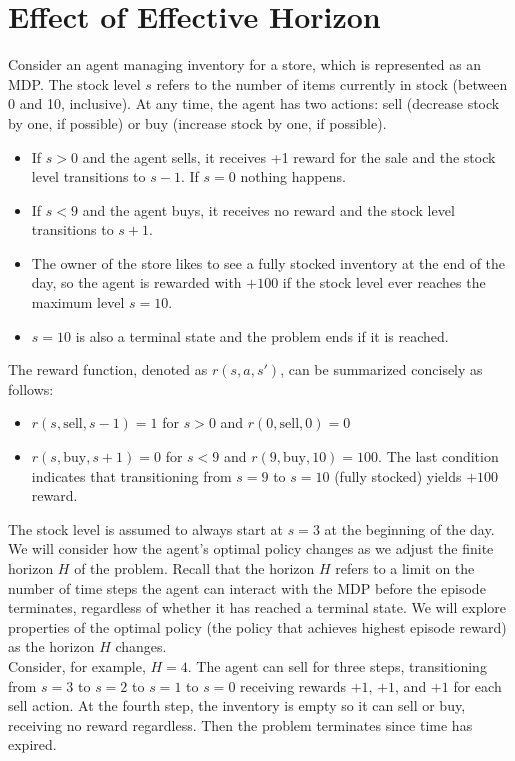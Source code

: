 \section{Effect of Effective Horizon} 


Consider an agent managing inventory for a store, which is represented as an MDP. The stock level $s$ refers to the number of items currently in stock (between 0 and 10, inclusive). At any time, the agent has two actions: sell (decrease stock by one, if possible) or buy (increase stock by one, if possible).  
\begin{itemize}
\item If $s 
 > 0$ and the agent sells, it receives +1 reward for the sale and the stock level transitions to $s - 1$. If $s = 0$ nothing happens.
 \item If $s < 9$ and the agent buys, it receives no reward and the stock level transitions to $s +  1$.
 \item The owner of the store likes to see a fully stocked inventory at the end of the day, so the agent is rewarded with $+100$ if the stock level ever reaches the maximum level $s = 10$.
 \item $s = 10$ is also a terminal state and the problem ends if it is reached.
\end{itemize}

The reward function, denoted as $r(s, a, s')$, can be summarized concisely as follows:
\begin{itemize}
    \item $r(s,\text{sell}, s-1) = 1$ for $s > 0$ and $r(0,\text{sell},0) = 0$
    \item $r(s, \text{buy}, s+1) = 0$ for $s < 9$ and $r(9, \text{buy}, 10) = 100$. The last condition indicates that transitioning from $s = 9$ to $s = 10$ (fully stocked) yields $+100$ reward.
\end{itemize}

\noindent The stock level is assumed to always start at $s = 3$ at the beginning of the day. We will consider how the agent's optimal policy changes as we adjust the finite horizon $H$ of the problem. Recall that the horizon $H$ refers to a limit on the number of time steps the agent can interact with the MDP before the episode terminates, regardless of whether it has reached a terminal state. We will explore properties of the optimal policy (the policy that achieves highest episode reward) as the horizon $H$ changes.\\

\noindent Consider, for example, $H = 4$. The agent can sell for three steps, transitioning from $s = 3$ to $s = 2$ to $s = 1$ to $s = 0$ receiving rewards $+1$, $+1$, and $+1$ for each sell action. At the fourth step, the inventory is empty so it can sell or buy, receiving no reward regardless. Then the problem terminates since time has expired.


\begin{enumerate}[(a)]

  
  
  
  

\end{enumerate}